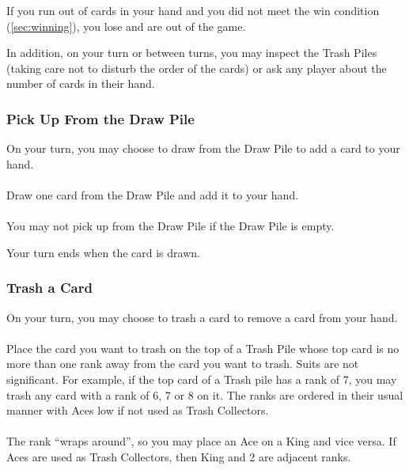 \documentclass{article}
\begin{document}
If you run out of cards in your hand and you did not meet the win condition (\autoref{sec:winning}), you lose and are out of the game.

In addition, on your turn or between turns, you may inspect the Trash Piles (taking care not to disturb the order of the cards) or ask any player about the number of cards in their hand.

\newpage
\subsubsection{Pick Up From the Draw Pile}
\label{sec:draw}

On your turn, you may choose to draw from the Draw Pile to add a card to your hand.

\paragraph{} \label{par:drawnormal}
Draw one card from the Draw Pile and add it to your hand.

\paragraph{} \label{par:drawempty}
You may not pick up from the Draw Pile if the Draw Pile is empty.

Your turn ends when the card is drawn.

\subsubsection{Trash a Card}
\label{sec:trashcard}

On your turn, you may choose to trash a card to remove a card from your hand.

\paragraph{} \label{par:trashvalid}
Place the card you want to trash on the top of a Trash Pile whose top card is no more than one rank away from the card you want to trash. Suits are not significant. For example, if the top card of a Trash pile has a rank of 7, you may trash any card with a rank of 6, 7 or 8 on it.
The ranks are ordered in their usual manner with Aces low if not used as Trash Collectors.

\paragraph{} \label{par:trashwraparound}
The rank ``wraps around'', so you may place an Ace on a King and vice versa. If Aces are used as Trash Collectors, then King and 2 are adjacent ranks.
\end{document}
